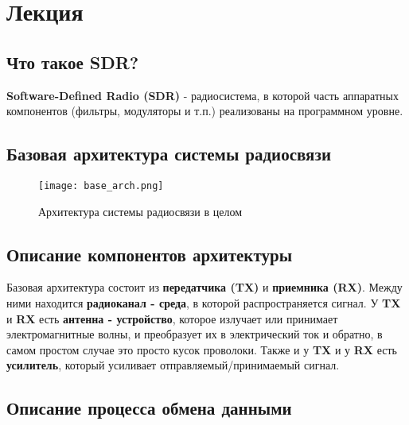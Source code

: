 \chapter{Лекция}
\label{ch:intro}

\section*{Что такое SDR?}

\textbf{Software-Defined Radio (SDR)} - радиосистема, в которой часть аппаратных компонентов (фильтры, модуляторы и т.п.) 
реализованы на программном уровне.

\section*{Базовая архитектура системы радиосвязи}

\begin{figure}[H]
    \centering
    \texttt{[image: base\_arch.png]}
    \caption{Архитектура системы радиосвязи в целом}
\end{figure}

\section*{Описание компонентов архитектуры}

Базовая архитектура состоит из \textbf{передатчика (TX)} и \textbf{приемника (RX)}. Между ними находится \textbf{радиоканал - среда}, в которой распространяется сигнал. У \textbf{TX} и \textbf{RX} есть \textbf{антенна - устройство}, которое излучает или принимает электромагнитные волны, и преобразует их в электрический ток и обратно, в самом простом случае это просто кусок проволоки. Также и у \textbf{TX} и у \textbf{RX} есть \textbf{усилитель}, который усиливает отправляемый/принимаемый сигнал.

\section*{Описание процесса обмена данными}

